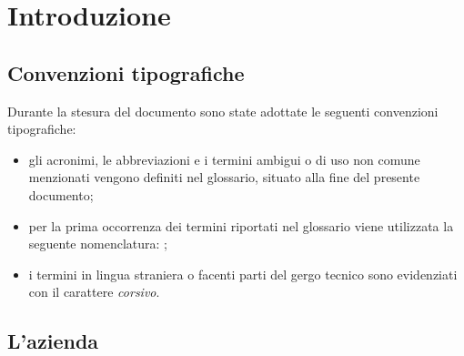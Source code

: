 
\chapter{Introduzione}
\label{cap:introduzione}
\section{Convenzioni tipografiche}
\label{sec:convenzioni tipografiche}
Durante la stesura del documento sono state adottate le seguenti convenzioni tipografiche:
\begin{itemize}
	\item gli acronimi, le abbreviazioni e i termini ambigui o di uso non comune menzionati vengono definiti nel glossario, situato alla fine del presente documento;
	\item per la prima occorrenza dei termini riportati nel glossario viene utilizzata la seguente nomenclatura: {\color{RoyalBlue}{parola\glsfirstoccur}};
	\item i termini in lingua straniera o facenti parti del gergo tecnico sono evidenziati con il carattere \emph{corsivo}.
\end{itemize}




\section{L'azienda}

